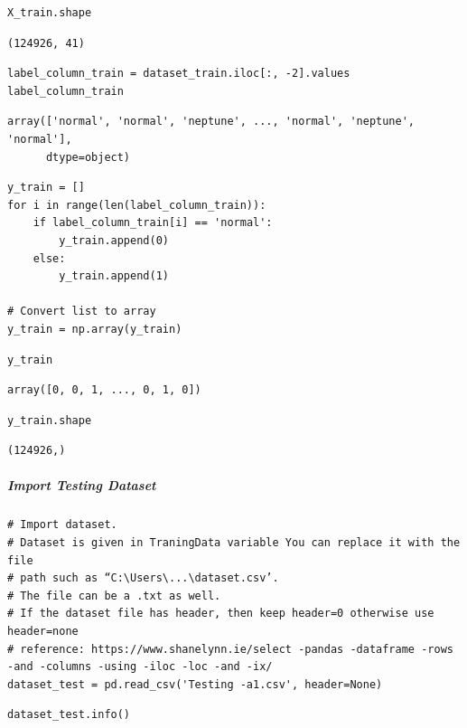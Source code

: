 \begin{verbatim}
X_train.shape
\end{verbatim}

\begin{verbatim}
(124926, 41)
\end{verbatim}

\begin{verbatim}
label_column_train = dataset_train.iloc[:, -2].values
label_column_train
\end{verbatim}

\begin{verbatim}
array(['normal', 'normal', 'neptune', ..., 'normal', 'neptune', 'normal'],
      dtype=object)
\end{verbatim}

\begin{verbatim}
y_train = []
for i in range(len(label_column_train)):
    if label_column_train[i] == 'normal':
        y_train.append(0)
    else:
        y_train.append(1)

# Convert list to array
y_train = np.array(y_train)
\end{verbatim}

\begin{verbatim}
y_train
\end{verbatim}

\begin{verbatim}
array([0, 0, 1, ..., 0, 1, 0])
\end{verbatim}

\begin{verbatim}
y_train.shape
\end{verbatim}

\begin{verbatim}
(124926,)
\end{verbatim}

\subparagraph{Import Testing Dataset}

\begin{verbatim}
# Import dataset.
# Dataset is given in TraningData variable You can replace it with the file 
# path such as “C:\Users\...\dataset.csv’. 
# The file can be a .txt as well. 
# If the dataset file has header, then keep header=0 otherwise use header=none
# reference: https://www.shanelynn.ie/select -pandas -dataframe -rows -and -columns -using -iloc -loc -and -ix/
dataset_test = pd.read_csv('Testing -a1.csv', header=None)
\end{verbatim}

\begin{verbatim}
dataset_test.info()
\end{verbatim}

